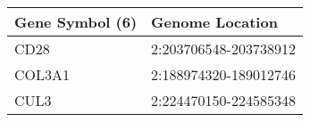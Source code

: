 \begin{tabular}{ll}
\toprule
Gene Symbol (6) &       Genome Location \\
\midrule
           CD28 & 2:203706548-203738912 \\
         COL3A1 & 2:188974320-189012746 \\
           CUL3 & 2:224470150-224585348 \\
\bottomrule
\end{tabular}
